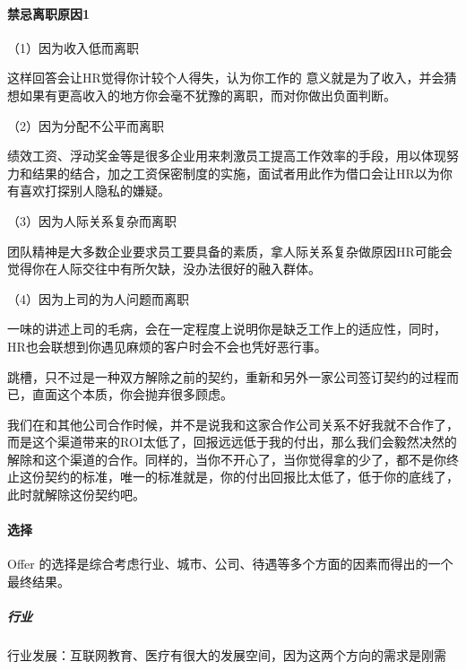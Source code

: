 \documentclass[letterpaper,11pt,english]{sphinxmanual}
\begin{document}
\paragraph{禁忌离职原因1\sphinxfootnotemark[292]}
\label{\detokenize{chapter_interview/HR:id8}}%
\begin{footnotetext}[292]\sphinxAtStartFootnote
{}
%
\end{footnotetext}\ignorespaces 
（1）因为收入低而离职

这样回答会让HR觉得你计较个人得失，认为你工作的
意义就是为了收入，并会猜想如果有更高收入的地方你会毫不犹豫的离职，而对你做出负面判断。

（2）因为分配不公平而离职

绩效工资、浮动奖金等是很多企业用来刺激员工提高工作效率的手段，用以体现努力和结果的结合，加之工资保密制度的实施，面试者用此作为借口会让HR以为你有喜欢打探别人隐私的嫌疑。

（3）因为人际关系复杂而离职

团队精神是大多数企业要求员工要具备的素质，拿人际关系复杂做原因HR可能会觉得你在人际交往中有所欠缺，没办法很好的融入群体。

（4）因为上司的为人问题而离职

一味的讲述上司的毛病，会在一定程度上说明你是缺乏工作上的适应性，同时，HR也会联想到你遇见麻烦的客户时会不会也凭好恶行事。

跳槽，只不过是一种双方解除之前的契约，重新和另外一家公司签订契约的过程而已，直面这个本质，你会抛弃很多顾虑。

我们在和其他公司合作时候，并不是说我和这家合作公司关系不好我就不合作了，而是这个渠道带来的ROI太低了，回报远远低于我的付出，那么我们会毅然决然的解除和这个渠道的合作。同样的，当你不开心了，当你觉得拿的少了，都不是你终止这份契约的标准，唯一的标准就是，你的付出回报比太低了，低于你的底线了，此时就解除这份契约吧。%
\begin{footnote}[293]\sphinxAtStartFootnote
{}
%
\end{footnote}


\paragraph{选择}
\label{\detokenize{chapter_interview/HR:id9}}
Offer
的选择是综合考虑行业、城市、公司、待遇等多个方面的因素而得出的一个最终结果。


\subparagraph{行业}
\label{\detokenize{chapter_interview/HR:id10}}
行业发展：互联网教育、医疗有很大的发展空间，因为这两个方向的需求是刚需
\end{document}
